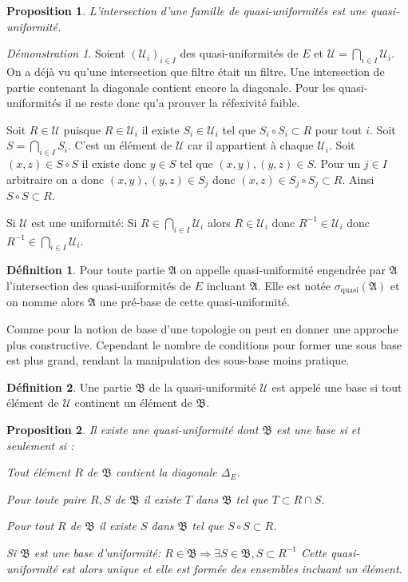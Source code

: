 \documentclass[a4paper, 11pt, french]{book}
\newenvironment{itemise}{\itemize}{\enditemize}
\theoremstyle{plain} %
\newtheorem{proposition}{Proposition}
\theoremstyle{definition} %
\newtheorem{definition}{Définition}
\theoremstyle{remark} %
\newtheorem*{demonstration}{Démonstration}
\newcommand{\1}{\mathds{1}}
\newcommand{\inv}[1]{#1^{-1}}
\renewcommand{\frak}[1]{\mathfrak{#1}}
\newcommand{\scr}[1]{\mathscr{#1}}
\renewcommand{\rm}[1]{\mathrm{#1}}
\begin{document}
\begin{proposition}
	L'intersection d'une famille de quasi-uniformités est une quasi-uniformité.
\end{proposition}

\begin{demonstration}
	Soient $(\scr{U}_i)_{i\in I}$ des quasi-uniformités de $E$ et $\scr{U}=\bigcap_{i\in I}\scr{U}_i$.
	On a déjà vu qu'une intersection que filtre était un filtre.
	Une intersection de partie contenant la diagonale contient encore la diagonale.
	Pour les quasi-uniformités il ne reste donc qu'a prouver la réfexivité faible.
	
	Soit $R\in\scr{U}$ puisque $R\in\scr{U}_i$ il existe $S_i\in\scr{U}_i$ tel que $S_i\circ S_i\subset R$ pour tout $i$.
	Soit $S=\bigcap_{i\in I} S_i$.
	C'est un élément de $\scr{U}$ car il appartient à chaque $\scr{U}_i$.
	Soit $(x, z)\in S\circ S$ il existe donc $y\in S$ tel que $(x, y), (y, z)\in S$.
	Pour un $j\in I$ arbitraire on a donc $(x, y), (y, z)\in S_j$ donc $(x, z)\in S_j\circ S_j\subset R$.
	Ainsi $S\circ S\subset R$.

	Si $\scr{U}$ est une uniformité: Si $R\in\bigcap_{i\in I}\scr{U}_i$ alors $R\in\scr{U}_i$ donc $\inv{R}\in\scr{U}_i$ donc $\inv{R}\in\bigcap_{i\in I}\scr{U}_i$.
\end{demonstration}

\begin{definition}
	Pour toute partie $\frak{A}$ on appelle quasi-uniformité engendrée par $\frak{A}$ l'intersection des quasi-uniformités de $E$ incluant $\frak{A}$.
	Elle est notée $\sigma_\rm{quasi}(\frak{A})$ et on nomme alors $\frak{A}$ une pré-base de cette quasi-uniformité.
\end{definition}

Comme pour la notion de base d'une topologie on peut en donner une approche plus constructive.
Cependant le nombre de conditions pour former une sous base est plus grand, rendant la manipulation des sous-base moins pratique.

\begin{definition}
	Une partie $\frak{B}$ de la quasi-uniformité $\scr{U}$ est appelé une base si tout élément de $\scr{U}$ continent un élément de $\frak{B}$.
\end{definition}

\begin{proposition}
	Il existe une quasi-uniformité dont $\frak{B}$ est une base si et seulement si :
	\begin{itemise}
		\item Tout élément $R$ de $\frak{B}$ contient la diagonale $\Delta_E$.
		\item Pour toute paire $R, S$ de $\frak{B}$ il existe $T$ dans $\frak{B}$ tel que $T\subset R\cap S$.
		\item Pour tout $R$ de $\frak{B}$ il existe $S$ dans $\frak{B}$ tel que $S\circ S\subset R$.
		\item Si $\frak{B}$ est une base d'uniformité: $R\in\frak{B}\Rightarrow\exists S\in\frak{B}, S\subset R^{-1}$
	\end{itemise}
	Cette quasi-uniformité est alors unique et elle est formée des ensembles incluant un élément.%
\end{proposition}
\end{document}
